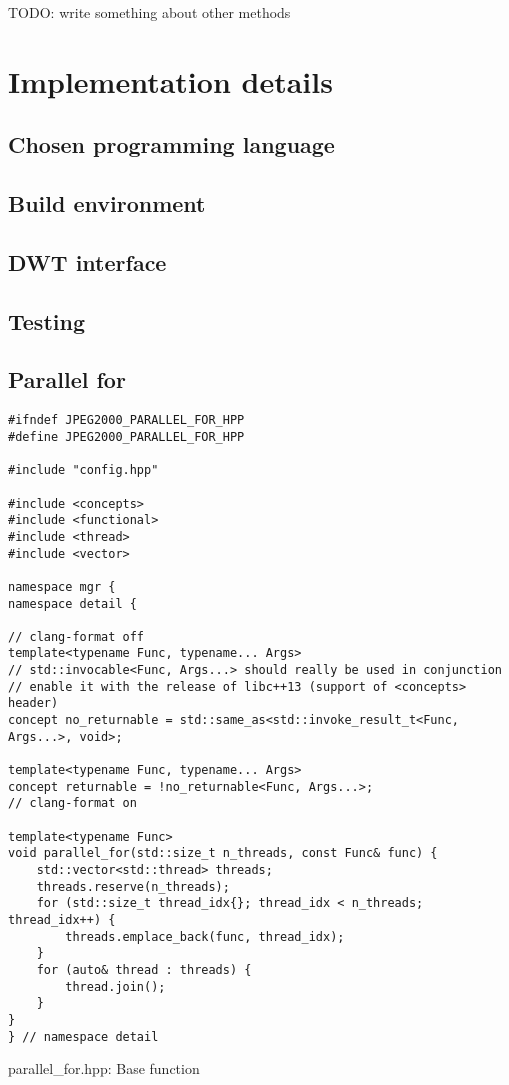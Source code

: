 TODO: write something about other methods

\section{Implementation details}

\subsection{Chosen programming language}

\subsection{Build environment}

\subsection{DWT interface}

\subsection{Testing}

\subsection{Parallel for}

\begin{listing}[htb]
\begin{verbatim}
#ifndef JPEG2000_PARALLEL_FOR_HPP
#define JPEG2000_PARALLEL_FOR_HPP

#include "config.hpp"

#include <concepts>
#include <functional>
#include <thread>
#include <vector>

namespace mgr {
namespace detail {

// clang-format off
template<typename Func, typename... Args>
// std::invocable<Func, Args...> should really be used in conjunction
// enable it with the release of libc++13 (support of <concepts> header)
concept no_returnable = std::same_as<std::invoke_result_t<Func, Args...>, void>;

template<typename Func, typename... Args>
concept returnable = !no_returnable<Func, Args...>;
// clang-format on

template<typename Func>
void parallel_for(std::size_t n_threads, const Func& func) {
    std::vector<std::thread> threads;
    threads.reserve(n_threads);
    for (std::size_t thread_idx{}; thread_idx < n_threads; thread_idx++) {
        threads.emplace_back(func, thread_idx);
    }
    for (auto& thread : threads) {
        thread.join();
    }
}
} // namespace detail
\end{verbatim}
\caption{parallel\_for.hpp: Base function}
\label{lst:parallel_for_base_function}
\end{listing}

